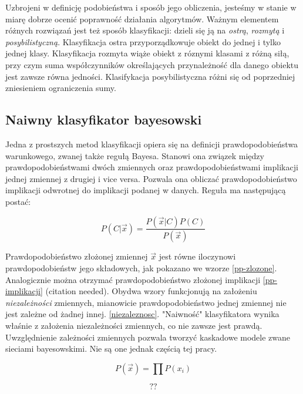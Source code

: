 \documentclass[12pt,a4paper,oneside]{report} %
\begin{document}
Uzbrojeni w definicję podobieństwa i sposób jego obliczenia, jesteśmy w stanie w miarę dobrze ocenić poprawność działania algorytmów. Ważnym elementem różnych rozwiązań jest też sposób klasyfikacji: dzieli się ją na \emph{ostrą}, \emph{rozmytą} i \emph{posybilistyczną}. Klasyfikacja ostra przyporządkowuje obiekt do jednej i tylko jednej klasy. Klasyfikacja rozmyta wiąże obiekt z róznymi klasami z różną siłą, przy czym suma współczynników określających przynależność dla danego obiektu jest zawsze równa jedności. Klasifykacja posybilistyczna różni się od poprzedniej zniesieniem ograniczenia sumy.\par

\subsection{Naiwny klasyfikator bayesowski}

Jedna z prostszych metod klasyfikacji opiera się na definicji prawdopodobieństwa warunkowego, zwanej także regułą Bayesa. Stanowi ona związek między prawdopodobieństwami dwóch zmiennych oraz prawdopodobieństwami implikacji jednej zmiennej z drugiej i vice versa. Pozwala ona obliczać prawdopodobieństwo implikacji odwrotnej do implikacji podanej w danych. Reguła ma następującą postać:

\begin{equation}
P(C|\vec{x}) = \frac{P(\vec{x}|C)P(C)}{P(\vec{x})}
\end{equation}

Prawdopodobieństwo złożonej zmiennej $\vec{x}$ jest równe iloczynowi prawdopodobieństw jego składowych, jak pokazano we wzorze \ref{pp-zlozone}. Analogicznie można otrzymać prawdopodobieństwo złożonej implikacji \ref{pp-implikacji} (citation needed). Obydwa wzory funkcjonują na założeniu \emph{niezależności} zmiennych, mianowicie prawdopodobieństwo jednej zmiennej nie jest zależne od żadnej innej. \ref{niezaleznosc}. "Naiwność" klasyfikatora wynika właśnie z założenia niezależności zmiennych, co nie zawsze jest prawdą. Uwzględnienie zależności zmiennych pozwala tworzyć kaskadowe modele zwane sieciami bayesowskimi.\cite{dm-cichosz} Nie są one jednak częścią tej pracy.\par

\begin{equation}
P(\vec{x}) = \prod{P(x_i)}
\end{equation}
\label{pp-zlozone}

\begin{equation}
??
\end{equation}
\label{pp-implikacji}
\end{document}
